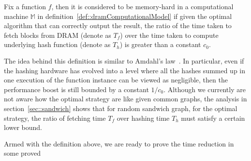 
\begin{definition}\label{def::memoryHard}%
  Fix a function $f$, then it is considered to be memory-hard in a computational machine $\mathbb{M}$ in definition~\ref{def::dramComputationalModel}
  if given the optimal algorithm that can correctly output the result, the ratio of the time taken to fetch blocks from DRAM (denote as $T_f$) over
  the time taken to compute underlying hash function (denote as $T_h$) is greater than a constant $c_0$.
\end{definition} 

The idea behind this definition is similar to Amdahl's law~\cite{amdahl1967validity}. In particular, even if the hashing hardware has evolved into
a level where all the hashes summed up in one execution of the function instance can be viewed as negligible, then the performance boost is
still bounded by a constant $1/c_0$. Although we currently are not aware how the optimal strategy are like given common graphs, the analysis in 
section~\ref{sec::sandwich} shows that for random sandwich graph, for the optimal strategy, the ratio of fetching time $T_f$ over hashing time $T_h$
must satisfy a certain lower bound.

Armed with the definition above, we are ready to prove the time reduction in some proved
